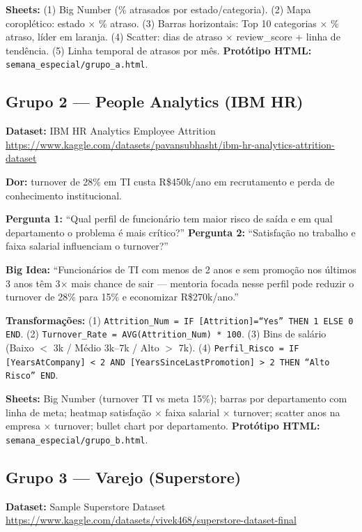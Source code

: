 \textbf{Sheets:} (1) Big Number (\% atrasados por estado/categoria). (2) Mapa coroplético: estado $\times$ \% atraso. (3) Barras horizontais: Top 10 categorias $\times$ \% atraso, líder em laranja. (4) Scatter: dias de atraso $\times$ review\_score + linha de tendência. (5) Linha temporal de atrasos por mês. \textbf{Protótipo HTML:} \texttt{semana\_especial/grupo\_a.html}.

\subsection{Grupo 2 --- People Analytics (IBM HR)}

\textbf{Dataset:} IBM HR Analytics Employee Attrition\\
\url{https://www.kaggle.com/datasets/pavansubhasht/ibm-hr-analytics-attrition-dataset}

\textbf{Dor:} turnover de 28\% em TI custa R\$450k/ano em recrutamento e perda de conhecimento institucional.

\textbf{Pergunta 1:} ``Qual perfil de funcionário tem maior risco de saída e em qual departamento o problema é mais crítico?'' \quad \textbf{Pergunta 2:} ``Satisfação no trabalho e faixa salarial influenciam o turnover?''

\textbf{Big Idea:} ``Funcionários de TI com menos de 2 anos e sem promoção nos últimos 3 anos têm 3$\times$ mais chance de sair --- mentoria focada nesse perfil pode reduzir o turnover de 28\% para 15\% e economizar R\$270k/ano.''

\textbf{Transformações:} (1) \texttt{Attrition\_Num = IF [Attrition]=``Yes'' THEN 1 ELSE 0 END}. (2) \texttt{Turnover\_Rate = AVG(Attrition\_Num) * 100}. (3) Bins de salário (Baixo $<$ 3k / Médio 3k--7k / Alto $>$ 7k). (4) \texttt{Perfil\_Risco = IF [YearsAtCompany] < 2 AND [YearsSinceLastPromotion] > 2 THEN ``Alto Risco'' END}.

\textbf{Sheets:} Big Number (turnover TI vs meta 15\%); barras por departamento com linha de meta; heatmap satisfação $\times$ faixa salarial $\times$ turnover; scatter anos na empresa $\times$ turnover; bullet chart por departamento. \textbf{Protótipo HTML:} \texttt{semana\_especial/grupo\_b.html}.

\subsection{Grupo 3 --- Varejo (Superstore)}

\textbf{Dataset:} Sample Superstore Dataset\\
\url{https://www.kaggle.com/datasets/vivek468/superstore-dataset-final}

